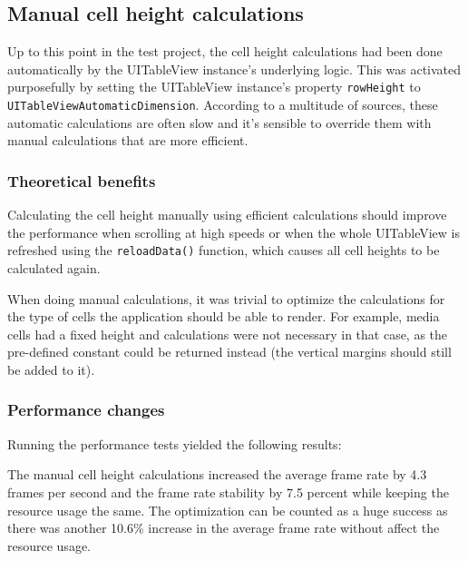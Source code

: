 \documentclass[a4paper,12pt]{article}
\begin{document}
\subsection{Manual cell height calculations}\label{subsection:ManualCellHeightCalculations}
Up to this point in the test project, the cell height calculations had been done automatically by the UITableView instance's underlying logic. This was activated purposefully by setting the UITableView instance's property \texttt{rowHeight} to \texttt{UITableViewAutomaticDimension}. According to a multitude of sources, these automatic calculations are often slow and it's sensible to override them with manual calculations that are more efficient.\cite{PerfectSmoothScrollingInUITableViews}\cite{HowToMakeDynamicTableViewCellHeight}\cite{MediumSmoothScrollPrearo}

\subsubsection{Theoretical benefits}
Calculating the cell height manually using efficient calculations should improve the performance when scrolling at high speeds or when the whole UITableView is refreshed using the \texttt{reloadData()} function, which causes all cell heights to be calculated again.

When doing manual calculations, it was trivial to optimize the calculations for the type of cells the application should be able to render. For example, media cells had a fixed height and calculations were not necessary in that case, as the pre-defined constant could be returned instead (the vertical margins should still be added to it).

\subsubsection{Performance changes}
Running the performance tests yielded the following results:

The manual cell height calculations increased the average frame rate by 4.3 frames per second and the frame rate stability by 7.5 percent while keeping the resource usage the same. The optimization can be counted as a huge success as there was another 10.6\% increase in the average frame rate without affect the resource usage. 
\end{document}
